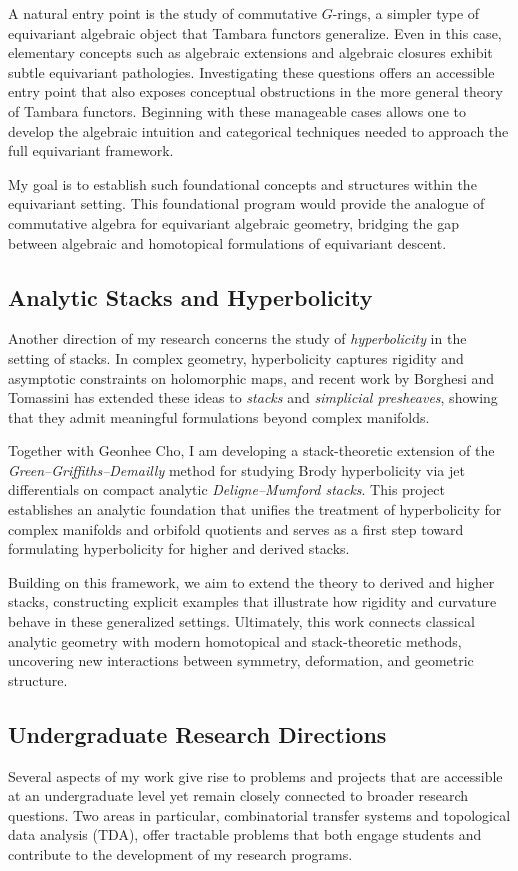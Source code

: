 \documentclass[11pt]{article}
\begin{document}
A natural entry point is the study of commutative $G$-rings, a simpler type of equivariant algebraic object that Tambara functors generalize.
Even in this case, elementary concepts such as algebraic extensions and algebraic closures exhibit subtle equivariant pathologies.
Investigating these questions offers an accessible entry point that also exposes conceptual obstructions in the more general theory of Tambara functors.
Beginning with these manageable cases allows one to develop the algebraic intuition and categorical techniques needed to approach the full equivariant framework.

My goal is to establish such foundational concepts and structures within the equivariant setting.
This foundational program would provide the analogue of commutative algebra for equivariant algebraic geometry, bridging the gap between algebraic and homotopical formulations of equivariant descent.

\subsection*{Analytic Stacks and Hyperbolicity}
Another direction of my research concerns the study of {\it hyperbolicity} in the setting of stacks.
In complex geometry, hyperbolicity captures rigidity and asymptotic constraints on holomorphic maps, and recent work by Borghesi and Tomassini \cite{MR3673667} has extended these ideas to {\it stacks} and {\it simplicial presheaves}, showing that they admit meaningful formulations beyond complex manifolds.

Together with Geonhee Cho, I am developing a stack-theoretic extension of the {\it Green–Griffiths–Demailly} method for studying Brody hyperbolicity via jet differentials on compact analytic {\it Deligne–Mumford stacks}.
This project establishes an analytic foundation that unifies the treatment of hyperbolicity for complex manifolds and orbifold quotients and serves as a first step toward formulating hyperbolicity for higher and derived stacks.

Building on this framework, we aim to extend the theory to derived and higher stacks, constructing explicit examples that illustrate how rigidity and curvature behave in these generalized settings.
Ultimately, this work connects classical analytic geometry with modern homotopical and stack-theoretic methods, uncovering new interactions between symmetry, deformation, and geometric structure.

\subsection*{Undergraduate Research Directions}
Several aspects of my work give rise to problems and projects that are accessible at an undergraduate level yet remain closely connected to broader research questions.
Two areas in particular, combinatorial transfer systems and topological data analysis (TDA), offer tractable problems that both engage students and contribute to the development of my research programs.
\end{document}
